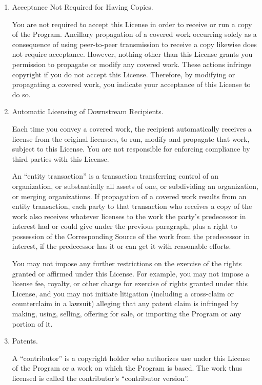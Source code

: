 \begin{enumerate}
\item Acceptance Not Required for Having Copies.

You are not required to accept this License in order to receive or
run a copy of the Program.  Ancillary propagation of a covered work
occurring solely as a consequence of using peer-to-peer transmission
to receive a copy likewise does not require acceptance.  However,
nothing other than this License grants you permission to propagate or
modify any covered work.  These actions infringe copyright if you do
not accept this License.  Therefore, by modifying or propagating a
covered work, you indicate your acceptance of this License to do so.

\item Automatic Licensing of Downstream Recipients.

Each time you convey a covered work, the recipient automatically
receives a license from the original licensors, to run, modify and
propagate that work, subject to this License.  You are not responsible
for enforcing compliance by third parties with this License.

An ``entity transaction'' is a transaction transferring control of an
organization, or substantially all assets of one, or subdividing an
organization, or merging organizations.  If propagation of a covered
work results from an entity transaction, each party to that
transaction who receives a copy of the work also receives whatever
licenses to the work the party's predecessor in interest had or could
give under the previous paragraph, plus a right to possession of the
Corresponding Source of the work from the predecessor in interest, if
the predecessor has it or can get it with reasonable efforts.

You may not impose any further restrictions on the exercise of the
rights granted or affirmed under this License.  For example, you may
not impose a license fee, royalty, or other charge for exercise of
rights granted under this License, and you may not initiate litigation
(including a cross-claim or counterclaim in a lawsuit) alleging that
any patent claim is infringed by making, using, selling, offering for
sale, or importing the Program or any portion of it.

\item Patents.

A ``contributor'' is a copyright holder who authorizes use under this
License of the Program or a work on which the Program is based.  The
work thus licensed is called the contributor's ``contributor version''.


\end{enumerate}
